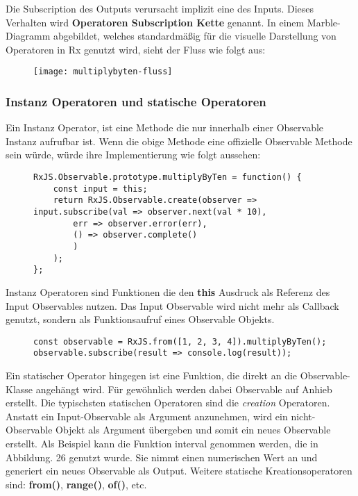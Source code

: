 \noindent
Die Subscription des Outputs verursacht implizit eine des Inputs. Dieses Verhalten wird \textbf{Operatoren Subscription Kette} genannt. In einem Marble-Diagramm abgebildet, welches standardmäßig für die visuelle Darstellung von Operatoren in Rx genutzt wird, sieht der Fluss wie folgt aus:

\begin{figure}[H]
\centering
\texttt{[image: multiplybyten-fluss]}
\end{figure}

\subsubsection{Instanz Operatoren und statische Operatoren}
Ein Instanz Operator, ist eine Methode die nur innerhalb einer Observable Instanz aufrufbar ist. Wenn die obige Methode eine offizielle Observable Methode sein würde, würde ihre Implementierung wie folgt aussehen:

\begin{figure}[H]
\begin{lstlisting}[basicstyle=\small]
RxJS.Observable.prototype.multiplyByTen = function() {
    const input = this;
    return RxJS.Observable.create(observer => input.subscribe(val => observer.next(val * 10),
        err => observer.error(err),
        () => observer.complete()
        )
    );
};
\end{lstlisting}
\end{figure}

\noindent
Instanz Operatoren sind Funktionen die den \textbf{this} Ausdruck als Referenz des Input Observables nutzen. Das Input Observable wird nicht mehr als Callback genutzt, sondern als Funktionsaufruf eines Observable Objekts.

\begin{figure}[H]
\begin{lstlisting}[basicstyle=\small]
const observable = RxJS.from([1, 2, 3, 4]).multiplyByTen();
observable.subscribe(result => console.log(result));
\end{lstlisting}
\end{figure}

\noindent
Ein statischer Operator hingegen ist eine Funktion, die direkt an die Observable-Klasse angehängt wird. Für gewöhnlich werden dabei Observable auf Anhieb erstellt. Die typischsten statischen Operatoren sind die \textit{creation} Operatoren. Anstatt ein Input-Observable als Argument anzunehmen, wird ein nicht-Observable Objekt als Argument übergeben und somit ein neues Observable erstellt. Als Beispiel kann die Funktion interval genommen werden, die in Abbildung. 26 genutzt wurde. Sie nimmt einen numerischen Wert an und generiert ein neues Observable als Output. Weitere statische Kreationsoperatoren sind: \textbf{from()}, \textbf{range()}, \textbf{of()}, etc.

